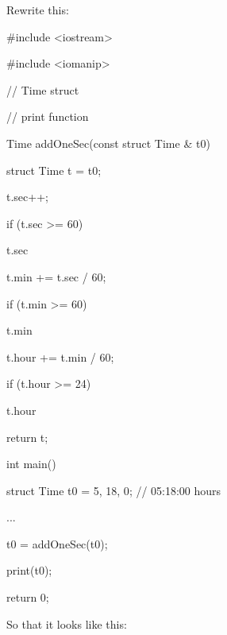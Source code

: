 Rewrite this:



\begin{consolethree}[escapeinside=||]

#include <iostream>

#include <iomanip>



// Time struct



// print function



Time addOneSec(const struct Time & t0)

{

  struct Time t = t0;

  t.sec++;

  if (t.sec >= 60)

  {

    t.sec %

    t.min += t.sec / 60;

    if (t.min >= 60)

    {

      t.min %

      t.hour += t.min / 60;

      if (t.hour >= 24)

      {

        t.hour %

      }

    }

  }

  return t;

}



int main()

{

  struct Time t0 = {5, 18, 0}; // 05:18:00 hours



  ...



  t0 = addOneSec(t0);

  print(t0);



  return 0;

}

\end{consolethree}



So that it looks like this:



